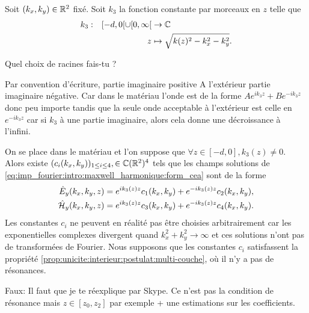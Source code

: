     \begin{defn}
        Soit \((k_x,k_y) \in \mathbb R^2\) fixé.
        Soit \(k_3\) la fonction constante par morceaux en \(z\) telle que
        \begin{equation*}
          \begin{aligned} &k_3: & [-d,0[\cup[0,\infty[ &\rightarrow \mathbb C \\ & & z & \mapsto \sqrt{k(z)^2 - k_x^2 - k_y^2}. \end{aligned}
        \end{equation*}
        \begin{REM}
          Quel choix de racines fais-tu ?
        \end{REM}
        \begin{REP}
          Par convention d'écriture, partie imaginaire positive
          A l’extérieur partie imaginaire négative.
          Car dans le matériau l'onde est de la forme \(A e^{ik_3z} + B e^{-ik_3z}\) donc peu importe tandis que la seule onde acceptable à l’extérieur est celle en \(e^{-ik_3 z}\) car si \(k_3\) à une partie imaginaire, alors cela donne une décroissance à l'infini.
        \end{REP}
    \end{defn}

    \begin{prop}
        On se place dans le matériau et l’on suppose que \(\forall z \in [-d,0], k_3(z) \not = 0\).
        Alors existe \((c_i(k_x,k_y))_{1\le i \le4}, \in \mathbb C(\mathbb R^2)^4\) tels que les champs solutions de \ref{eq:imp_fourier:intro:maxwell_harmonique:form_cea} sont de la forme
        \begin{align*}
            \hat{E}_y(k_x,k_y,z) & = e^{ik_3(z)z}c_1(k_x,k_y) + e^{-ik_3(z)z}c_2(k_x,k_y),
            \\
            \hat{\mathcal{H}}_y(k_x,k_y,z) & = e^{ik_3(z)z}c_3(k_x,k_y) + e^{-ik_3(z)z}c_4(k_x,k_y).
        \end{align*}
        Les constantes \(c_i\) ne peuvent en réalité pas être choisies arbitrairement car les exponentielles complexes divergent quand \(k_x^2 + k_y^2 \rightarrow \infty\) et ces solutions n'ont pas de transformées de Fourier. Nous supposons que les constantes \(c_i\) satisfassent la propriété \eqref{prop:unicite:interieur:postulat:multi-couche}, où il n'y a pas de résonances.
        \begin{REM}
          Faux: Il faut que je te réexplique par Skype. Ce n'est pas la condition de résonance mais \(z \in [z_0,z_2]\) par exemple + une estimations sur les coefficients.
        \end{REM}
    \end{prop}

